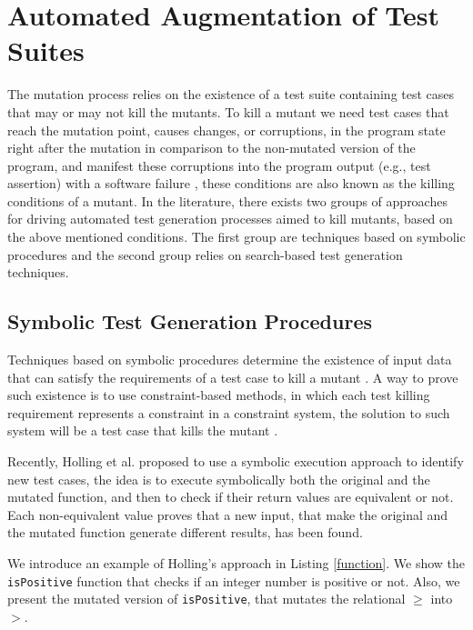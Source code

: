 
\section{Automated Augmentation of Test Suites}
\label{sec:testGeneration}

The mutation process relies on the existence of a test suite containing test cases that may or may not kill the mutants.
To kill a mutant we need test cases that reach the mutation point, causes changes, or corruptions, in the program state right after the mutation in comparison to the non-mutated version of the program, and manifest these corruptions into the program output (e.g., test assertion) with a software failure \cite{papadakis2019mutation}, these conditions are also known as the killing conditions of a mutant.
In the literature, there exists two groups of approaches for driving automated test generation processes aimed to kill mutants, based on the above mentioned conditions. The first group are techniques based on symbolic procedures and the second group relies on search-based test generation techniques.

\subsection{Symbolic Test Generation Procedures}

Techniques based on symbolic procedures determine the existence of input data that can satisfy the requirements of a test case to kill a mutant \cite{offutt1997automatically}. A way to prove such existence is to use constraint-based methods, in which each test killing requirement represents a constraint in a constraint system, the solution to such system will be a test case that kills the mutant \cite{demillo1991constraint}.

Recently, Holling et al. \cite{holling2016nequivack} proposed to use a symbolic execution approach to identify new test cases, the idea is to execute symbolically both the original and the mutated function, and then to check if their return values are equivalent or not. Each non-equivalent value proves that a new input, that make the original and the mutated function generate different results, has been found. 

We introduce an example of Holling's approach in Listing \ref{function}. We show the \texttt{isPositive} function that checks if an integer number is positive or not. Also, we present the mutated version of \texttt{isPositive}, that mutates the relational $\geq$ into $>$.

